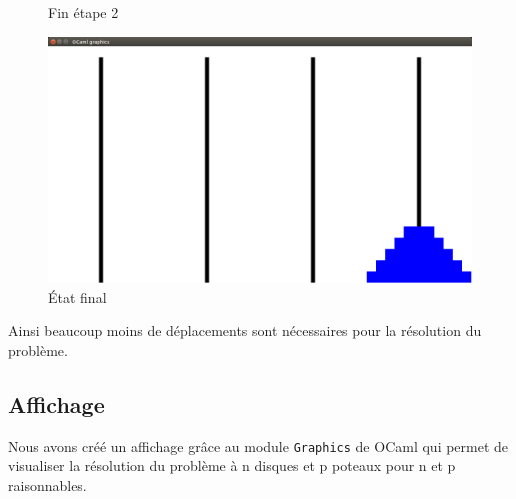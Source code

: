 \documentclass[a4paper, 11pt]{article}%
\begin{document}
\begin{figure}[!h]
			  \caption{Fin étape 2}\label{fig:hanoi_gen_mid2}
			\endminipage\hfill
			  \includegraphics[width=\linewidth]{hanoi_gen_end.png}
			  \caption{État final}\label{fig:hanoi_gen_end}
			\endminipage\hfill
		\end{figure}
		
		Ainsi beaucoup moins de déplacements sont nécessaires pour la résolution
		du problème.
	
	\subsection{Affichage}
		Nous avons créé un affichage grâce au module \texttt{Graphics}
		de OCaml qui permet de visualiser la résolution du problème à n
		disques et p poteaux pour n et p raisonnables.
		
\end{document}
